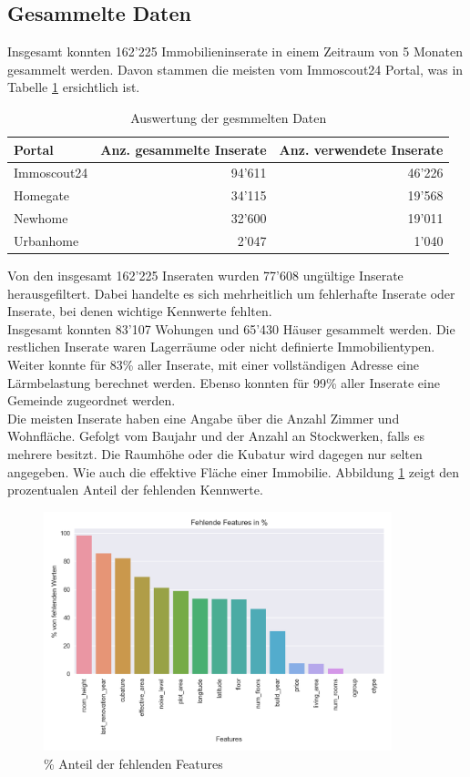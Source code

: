 \subsection{Gesammelte Daten}
Insgesamt konnten 162’225 Immobilieninserate in einem Zeitraum von 5 Monaten gesammelt werden. Davon stammen die meisten vom Immoscout24 Portal, was in Tabelle \ref{tab:crawled_data} ersichtlich ist.
\begin{table}[ht]
\centering
{}
\begin{tabular}{@{}lrr@{}}
\toprule
Portal &  Anz. gesammelte Inserate & Anz. verwendete Inserate \\
\midrule
Immoscout24 & 94'611 & 46'226\\
Homegate & 34'115 & 19'568\\
Newhome & 32'600 & 19'011\\
Urbanhome & 2'047 & 1'040\\
\bottomrule
\end{tabular}
\caption{Auswertung der gesmmelten Daten}
\label{tab:crawled_data}
\end{table}
%
Von den insgesamt 162’225 Inseraten wurden 77’608 ungültige Inserate herausgefiltert. 
Dabei handelte es sich mehrheitlich um fehlerhafte Inserate oder Inserate, bei denen wichtige Kennwerte fehlten.\\
Insgesamt konnten 83’107 Wohungen und 65’430 Häuser gesammelt werden. Die restlichen Inserate waren Lagerräume oder nicht definierte Immobilientypen.\\
Weiter konnte für 83\% aller Inserate, mit einer vollständigen Adresse eine Lärmbelastung berechnet werden. Ebenso konnten für 99\% aller Inserate eine Gemeinde zugeordnet werden.\\
Die meisten Inserate haben eine Angabe über die Anzahl Zimmer und Wohnfläche. Gefolgt vom Baujahr und der Anzahl an Stockwerken, falls es mehrere besitzt. Die Raumhöhe oder die Kubatur wird dagegen nur selten angegeben. Wie auch die effektive Fläche einer Immobilie. Abbildung \ref{fig:features} zeigt den prozentualen Anteil der fehlenden Kennwerte.\\[2ex]
\begin{figure}[h!]
\centering
\includegraphics[width=0.9\textwidth]{images/missing_values.png}
\caption[\% Anteil der fehlenden Features]{\% Anteil der fehlenden Features}%
\label{fig:features}
\end{figure}
